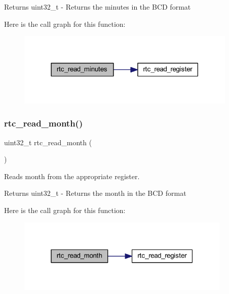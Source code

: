 \begin{DoxyReturn}{Returns}
uint32\+\_\+t -\/ Returns the minutes in the B\+CD format 
\end{DoxyReturn}
Here is the call graph for this function\+:
\nopagebreak
\begin{figure}[H]
\begin{center}
\leavevmode
\includegraphics[width=297pt]{group__rtc_gaac43b2266aa06ad5a572d0fa3976ebb0_cgraph}
\end{center}
\end{figure}
\mbox{\label{group__rtc_gabd90445bf474121fa89636a17f4c7369}} 
\subsubsection{\texorpdfstring{rtc\+\_\+read\+\_\+month()}{rtc\_read\_month()}}
{\footnotesize\ttfamily uint32\+\_\+t rtc\+\_\+read\+\_\+month (\begin{DoxyParamCaption}{ }\end{DoxyParamCaption})}



Reads month from the appropriate register. 

\begin{DoxyReturn}{Returns}
uint32\+\_\+t -\/ Returns the month in the B\+CD format 
\end{DoxyReturn}
Here is the call graph for this function\+:
\nopagebreak
\begin{figure}[H]
\begin{center}
\leavevmode
\includegraphics[width=289pt]{group__rtc_gabd90445bf474121fa89636a17f4c7369_cgraph}
\end{center}
\end{figure}
\mbox{\label{group__rtc_gaf6f18245f611a9c8f64055feae5ec73d}} 
